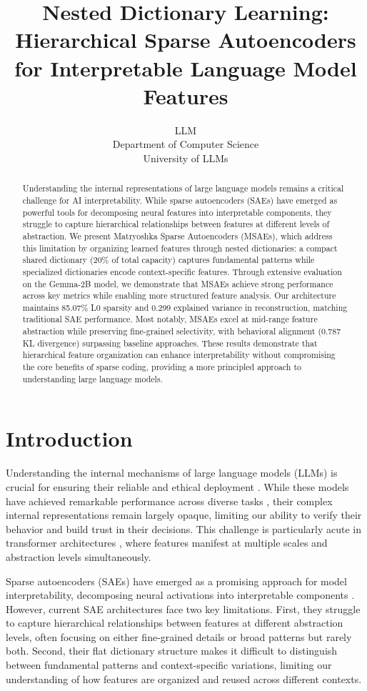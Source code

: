 \documentclass{article} %
\title{Nested Dictionary Learning: Hierarchical Sparse Autoencoders for Interpretable Language Model Features}
\author{LLM\\
Department of Computer Science\\
University of LLMs\\
}
\begin{document}
\maketitle

\begin{abstract}
Understanding the internal representations of large language models remains a critical challenge for AI interpretability. While sparse autoencoders (SAEs) have emerged as powerful tools for decomposing neural features into interpretable components, they struggle to capture hierarchical relationships between features at different levels of abstraction. We present Matryoshka Sparse Autoencoders (MSAEs), which address this limitation by organizing learned features through nested dictionaries: a compact shared dictionary (20\% of total capacity) captures fundamental patterns while specialized dictionaries encode context-specific features. Through extensive evaluation on the Gemma-2B model, we demonstrate that MSAEs achieve strong performance across key metrics while enabling more structured feature analysis. Our architecture maintains 85.07\% L0 sparsity and 0.299 explained variance in reconstruction, matching traditional SAE performance. Most notably, MSAEs excel at mid-range feature abstraction while preserving fine-grained selectivity, with behavioral alignment (0.787 KL divergence) surpassing baseline approaches. These results demonstrate that hierarchical feature organization can enhance interpretability without compromising the core benefits of sparse coding, providing a more principled approach to understanding large language models.
\end{abstract}

\section{Introduction}
\label{sec:intro}

Understanding the internal mechanisms of large language models (LLMs) is crucial for ensuring their reliable and ethical deployment \cite{Zhang2020ASO}. While these models have achieved remarkable performance across diverse tasks \cite{gpt4}, their complex internal representations remain largely opaque, limiting our ability to verify their behavior and build trust in their decisions. This challenge is particularly acute in transformer architectures \cite{vaswani2017attention}, where features manifest at multiple scales and abstraction levels simultaneously.

Sparse autoencoders (SAEs) have emerged as a promising approach for model interpretability, decomposing neural activations into interpretable components \cite{goodfellow2016deep}. However, current SAE architectures face two key limitations. First, they struggle to capture hierarchical relationships between features at different abstraction levels, often focusing on either fine-grained details or broad patterns but rarely both. Second, their flat dictionary structure makes it difficult to distinguish between fundamental patterns and context-specific variations, limiting our understanding of how features are organized and reused across different contexts.
\end{document}
